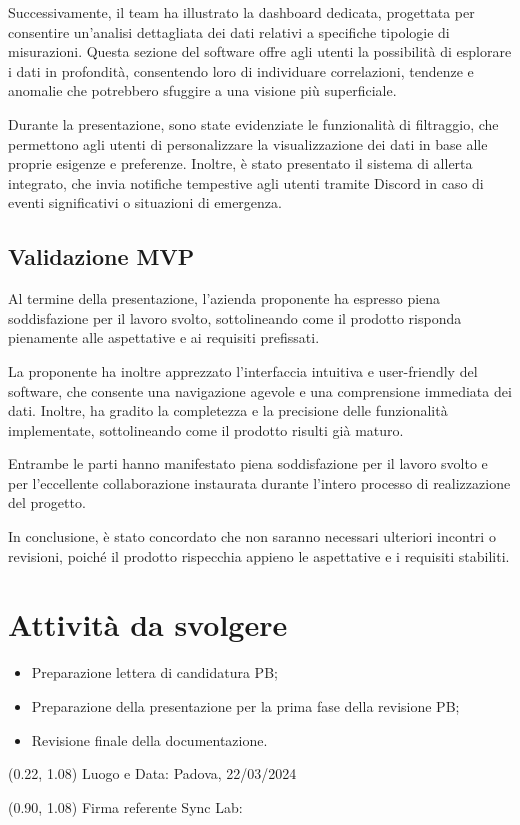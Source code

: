 \documentclass{article}
\begin{document}
    Successivamente, il team ha illustrato la dashboard dedicata, progettata per consentire un'analisi dettagliata dei dati relativi a specifiche tipologie di misurazioni. Questa sezione del software offre agli utenti la possibilità di esplorare i dati in profondità, consentendo loro di individuare correlazioni, tendenze e anomalie che potrebbero sfuggire a una visione più superficiale.

    Durante la presentazione, sono state evidenziate le funzionalità di filtraggio, che permettono agli utenti di personalizzare la visualizzazione dei dati in base alle proprie esigenze e preferenze. Inoltre, è stato presentato il sistema di allerta integrato, che invia notifiche tempestive agli utenti tramite Discord in caso di eventi significativi o situazioni di emergenza.

    \subsection{Validazione MVP}
    Al termine della presentazione, l'azienda proponente ha espresso piena soddisfazione per il lavoro svolto, sottolineando come il prodotto risponda pienamente alle aspettative e ai requisiti prefissati.
    
    La proponente ha inoltre apprezzato l'interfaccia intuitiva e user-friendly del software, che consente una navigazione agevole e una comprensione immediata dei dati. Inoltre, ha gradito la completezza e la precisione delle funzionalità implementate, sottolineando come il prodotto risulti già maturo.

    Entrambe le parti hanno manifestato piena soddisfazione per il lavoro svolto e per l'eccellente collaborazione instaurata durante l'intero processo di realizzazione del progetto.

    In conclusione, è stato concordato che non saranno necessari ulteriori incontri o revisioni, poiché il prodotto rispecchia appieno le aspettative e i requisiti stabiliti.

\section{Attività da svolgere}
    \begin{itemize}
        \item Preparazione lettera di candidatura PB;
        \item Preparazione della presentazione per la prima fase della revisione PB;
        \item Revisione finale della documentazione.
\end{itemize}
\begin{textblock*}{\textwidth}(0.22\textwidth, 1.08\textheight)
    Luogo e Data: Padova, 22/03/2024
\end{textblock*}

\begin{textblock*}{\textwidth}(0.90\textwidth, 1.08\textheight)
        Firma referente Sync Lab:
\end{textblock*}
\end{document}
